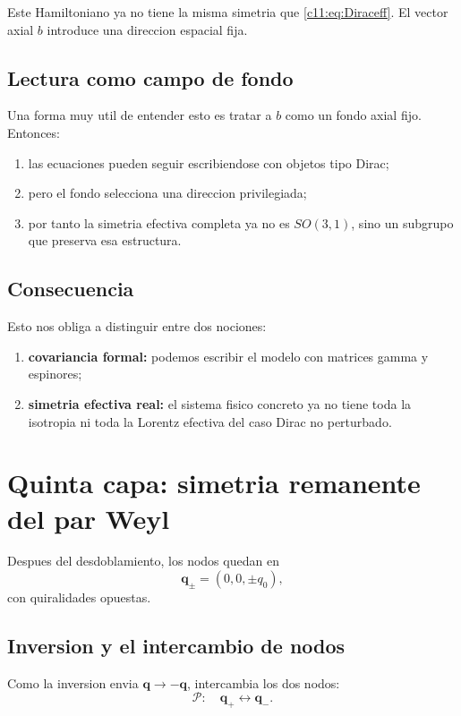 Este Hamiltoniano ya no tiene la misma simetria que \eqref{c11:eq:Diraceff}. El vector axial \(b\) introduce una direccion espacial fija.

\subsection{Lectura como campo de fondo}
Una forma muy util de entender esto es tratar a \(b\) como un fondo axial fijo. Entonces:
\begin{enumerate}[label=\arabic*.]
    \item las ecuaciones pueden seguir escribiendose con objetos tipo Dirac;
    \item pero el fondo selecciona una direccion privilegiada;
    \item por tanto la simetria efectiva completa ya no es \(SO(3,1)\), sino un subgrupo que preserva esa estructura.
\end{enumerate}

\subsection{Consecuencia}
Esto nos obliga a distinguir entre dos nociones:
\begin{enumerate}[label=\arabic*.]
    \item \textbf{covariancia formal:} podemos escribir el modelo con matrices gamma y espinores;
    \item \textbf{simetria efectiva real:} el sistema fisico concreto ya no tiene toda la isotropia ni toda la Lorentz efectiva del caso Dirac no perturbado.
\end{enumerate}

\section{Quinta capa: simetria remanente del par Weyl}
Despues del desdoblamiento, los nodos quedan en
\begin{equation}
\bm{q}_\pm=(0,0,\pm q_0),
\end{equation}
con quiralidades opuestas.

\subsection{Inversion y el intercambio de nodos}
Como la inversion envia \(\bm{q}\to -\bm{q}\), intercambia los dos nodos:
\begin{equation}
\mathcal{P}:\quad \bm{q}_+ \leftrightarrow \bm{q}_-.
\end{equation}


